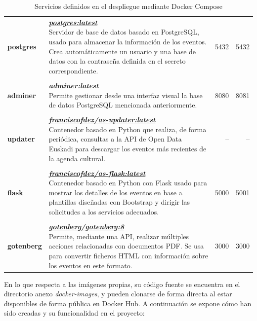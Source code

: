\documentclass{report}
\begin{document}
\begin{table}[H]
\begin{tabularx}{\textwidth}{lXrr}
                \\ \textbf{postgres} & {\parbox{5cm}{\textit{\textbf{\href{https://hub.docker.com/_/postgres}{postgres:latest}}} \\ Servidor de base de datos basado en PostgreSQL, usado para almacenar la información de los eventos. Crea automáticamente un usuario y una base de datos con la contraseña definida en el secreto correspondiente.}} & 5432 & 5432 \\
                \\ \textbf{adminer} & {\parbox{5cm}{\textit{\textbf{\href{https://hub.docker.com/_/adminer/}{adminer:latest}}}\\ Permite gestionar desde una interfaz visual la base de datos PostgreSQL mencionada anteriormente.}} & 8080 & 8081 \\
                \\ \textbf{updater} & {\parbox{5cm}{\textit{\textbf{\href{https://hub.docker.com/r/franciscofdez/as-updater}{franciscofdez/as-updater:latest}}} \\ Contenedor basado en Python que realiza, de forma periódica, consultas a la API de Open Data Euskadi para descargar los eventos más recientes de la agenda cultural.}} & -- & -- \\
                \\ \textbf{flask} & {\parbox{5cm}{\textbf{\textit{\href{https://hub.docker.com/r/franciscofdez/as-flask}{franciscofdez/as-flask:latest}}} \\ Contenedor basado en Python con Flask usado para mostrar los detalles de los eventos en base a plantillas diseñadas con Bootstrap y dirigir las solicitudes a los servicios adecuados.}} & 5000 & 5001 \\
                \\ \textbf{gotenberg} & {\parbox{5cm}{\textit{\textbf{\href{https://hub.docker.com/r/gotenberg/gotenberg}{gotenberg/gotenberg:8}}} \\ Permite, mediante una API, realizar múltiples acciones relacionadas con documentos PDF. Se usa para convertir ficheros HTML con información sobre los eventos en este formato.}} & 3000 & 3000 \\
                \bottomrule
            \end{tabularx}
        \caption{Servicios definidos en el despliegue mediante Docker Compose}
        \label{tab:docker}
        \end{table}

        En lo que respecta a las imágenes propias, su código fuente se encuentra en el directorio anexo \textit{docker-images}, y pueden clonarse de forma directa al estar disponibles de forma pública en Docker Hub. A continuación se expone cómo han sido creadas y su funcionalidad en el proyecto:
\end{document}
